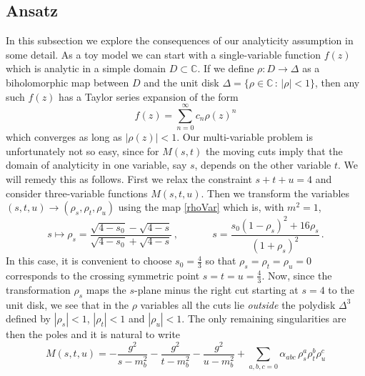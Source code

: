 \documentclass[12pt]{article}
\newcommand{\begBvR}[1]{\begin{#1}}
\newcommand{\beq}{\begBvR{equation}}
\newcommand{\eeq}{\end{equation}}
\newcommand{\<}{{\langle}}
\renewcommand{\>}{{\rangle}}
\def\a{{\alpha}}
\def\a{\alpha}
\begin{document}
\subsection{Ansatz}
In this subsection we explore the consequences of our analyticity assumption in some detail. As a toy model we can start with a single-variable function $f(z)$ which is analytic in a simple domain $D \subset \mathbb C$. If we define $\rho : D \to \Delta$ as a biholomorphic map between $D$ and the unit disk $\Delta = \{ \rho \in \mathbb C \,: \,| \rho | < 1\}$, then any such $f(z)$ has a Taylor series expansion of the form
\beq
f(z) = \sum_{n = 0}^\infty c_n \rho(z)^n
\eeq
which converges as long as $|\rho(z)| < 1$. Our multi-variable problem is unfortunately not so easy, since for $M(s,t)$ the moving cuts imply that the domain of analyticity in one variable, say $s$, depends on the other variable $t$. We will remedy this as follows. First we relax the constraint $s + t + u = 4$ and consider three-variable functions $M(s,t,u)$. Then we transform the variables $(s,t,u) \to (\rho_s,\rho_t,\rho_u)$ using the map \eqref{rhoVar} which is, with $m^2 = 1$,
\beq\label{s_to_rho}
s\mapsto \rho_s=
\frac{\sqrt{4-s_0}-\sqrt{4-s}}{\sqrt{4-s_0}+\sqrt{4-s}}\,,\qquad
\;\;\;\;\; s=\frac{s_0(1-\rho_s)^2+16\rho_s}{(1+\rho_s)^{2}}\,.
\eeq
In this case, it is convenient to choose $s_0=\frac{4}{3}$ so that $\rho_s=\rho_t=\rho_u=0$ corresponds to the crossing symmetric point $s=t=u=\frac{4}{3}$.
Now, since the transformation $\rho_s$ maps the $s$-plane minus the right cut starting at $s = 4$ to the unit disk, we see that in the $\rho$ variables all the cuts lie \textit{outside} the polydisk $\Delta^3$ defined by $|\rho_s| < 1$, $|\rho_t| < 1$ and $|\rho_u| < 1$. The only remaining singularities are then the poles and it is natural to write
\beq \label{eq:Asum}
M(s,t,u)  = - \frac{g^2}{s-m_b^2}-\frac{g^2}{t-m_b^2}-\frac{g^2}{u-m_b^2} + \sum_{a,b,c=0} \a_{abc}\, \rho_s^a \rho_t^b \rho_u^c 
\eeq
\end{document}
